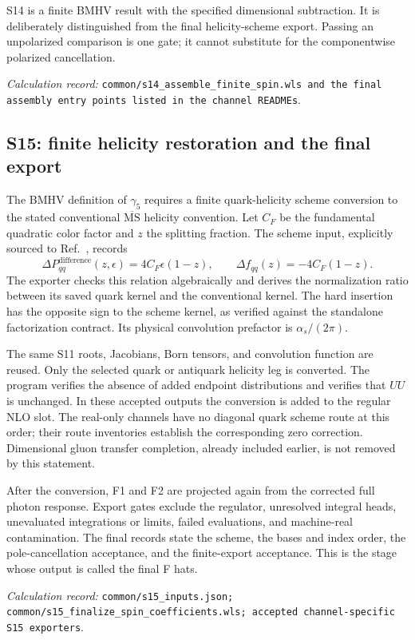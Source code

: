 \documentclass[11pt,a4paper]{article}
\newcommand{\as}{\alpha_s}
\newcommand{\eps}{\epsilon}
\newcommand{\MS}{\overline{\mathrm{MS}}}
\newcommand{\code}[1]{{\small\nolinkurl{#1}}}
\newcommand{\pathref}[1]{\par{\footnotesize\textit{Calculation record:} \code{#1}.}\par}
\begin{document}
S14 is a finite BMHV result with the specified dimensional subtraction. It is deliberately distinguished from the final helicity-scheme export. Passing an unpolarized comparison is one gate; it cannot substitute for the componentwise polarized cancellation.
\pathref{common/s14_assemble_finite_spin.wls and the final assembly entry points listed in the channel READMEs}

\subsection{S15: finite helicity restoration and the final export}
The BMHV definition of $\gamma_5$ requires a finite quark-helicity scheme conversion to the stated conventional $\MS$ helicity convention. Let $C_F$ be the fundamental quadratic color factor and $z$ the splitting fraction. The scheme input, explicitly sourced to Ref.~\cite{stratmann}, records
\begin{equation}
 \Delta P_{qq}^{\mathrm{difference}}(z,\eps)=4C_F\eps(1-z),
 \qquad \Delta f_{qq}(z)=-4C_F(1-z).
\end{equation}
The exporter checks this relation algebraically and derives the normalization ratio between its saved quark kernel and the conventional kernel. The hard insertion has the opposite sign to the scheme kernel, as verified against the standalone factorization contract. Its physical convolution prefactor is $\as/(2\pi)$.

The same S11 roots, Jacobians, Born tensors, and convolution function are reused. Only the selected quark or antiquark helicity leg is converted. The program verifies the absence of added endpoint distributions and verifies that $UU$ is unchanged. In these accepted outputs the conversion is added to the regular NLO slot. The real-only channels have no diagonal quark scheme route at this order; their route inventories establish the corresponding zero correction. Dimensional gluon transfer completion, already included earlier, is not removed by this statement.

After the conversion, F1 and F2 are projected again from the corrected full photon response. Export gates exclude the regulator, unresolved integral heads, unevaluated integrations or limits, failed evaluations, and machine-real contamination. The final records state the scheme, the bases and index order, the pole-cancellation acceptance, and the finite-export acceptance. This is the stage whose output is called the final F hats.
\pathref{common/s15_inputs.json; common/s15_finalize_spin_coefficients.wls; accepted channel-specific S15 exporters}
\end{document}
